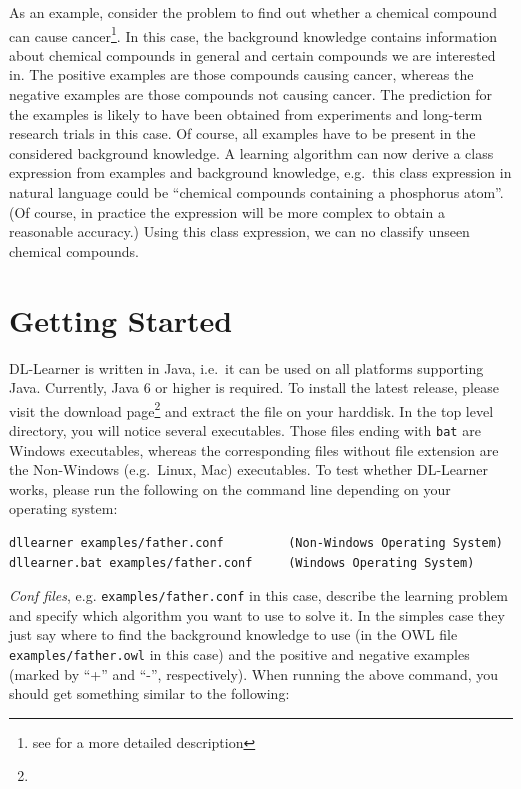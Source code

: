\documentclass[a4paper,12pt]{scrartcl}
\begin{document}
As an example, consider the problem to find out whether a chemical compound can cause cancer\footnote{see \carc{} for a more detailed description}. In this case, the background knowledge contains information about chemical compounds in general and certain compounds we are interested in. The positive examples are those compounds causing cancer, whereas the negative examples are those compounds not causing cancer. The prediction for the examples is likely to have been obtained from experiments and long-term research trials in this case. Of course, all examples have to be present in the considered background knowledge. A learning algorithm can now derive a class expression from examples and background knowledge, e.g.~this class expression in natural language could be ``chemical compounds containing a phosphorus atom''. (Of course, in practice the expression will be more complex to obtain a reasonable accuracy.) Using this class expression, we can no classify unseen chemical compounds.

\section{Getting Started}
\label{sec:start}

DL-Learner is written in Java, i.e.~it can be used on all platforms supporting Java. Currently, Java 6 or higher is required. To install the latest release, please visit the download page\footnote{\dldownload} and extract the file on your harddisk. In the top level directory, you will notice several executables. Those files ending with \verb|bat| are Windows executables, whereas the corresponding files without file extension are the Non-Windows (e.g.~Linux, Mac) executables. To test whether DL-Learner works, please run the following on the command line depending on your operating system:

\begin{verbatim}
dllearner examples/father.conf         (Non-Windows Operating System)
dllearner.bat examples/father.conf     (Windows Operating System)
\end{verbatim}

\emph{Conf files}, e.g. \verb|examples/father.conf| in this case, describe the learning problem and specify which algorithm you want to use to solve it. In the simples case they just say where to find the background knowledge to use (in the OWL file \verb|examples/father.owl| in this case) and the positive and negative examples (marked by ``+'' and ``-'', respectively). When running the above command, you should get something similar to the following:
\end{document}
